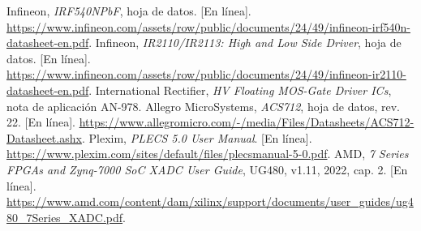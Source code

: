 \expandafter\def\csname fuenteirf\endcsname{Infineon, \textit{IRF540NPbF}, hoja de datos. [En línea]. \url{https://www.infineon.com/assets/row/public/documents/24/49/infineon-irf540n-datasheet-en.pdf}.}
\expandafter\def\csname fuenteir\endcsname{Infineon, \textit{IR2110/IR2113: High and Low Side Driver}, hoja de datos. [En línea]. \url{https://www.infineon.com/assets/row/public/documents/24/49/infineon-ir2110-datasheet-en.pdf}.}
\expandafter\def\csname fuentean978\endcsname{International Rectifier, \textit{HV Floating MOS-Gate Driver ICs}, nota de aplicación AN-978.}
\expandafter\def\csname fuenteacs\endcsname{Allegro MicroSystems, \textit{ACS712}, hoja de datos, rev. 22. [En línea]. \url{https://www.allegromicro.com/-/media/Files/Datasheets/ACS712-Datasheet.ashx}.}
\expandafter\def\csname fuenteplecs\endcsname{Plexim, \textit{PLECS 5.0 User Manual}. [En línea]. \url{https://www.plexim.com/sites/default/files/plecsmanual-5-0.pdf}.}
\expandafter\def\csname fuentexadc\endcsname{AMD, \textit{7 Series FPGAs and Zynq-7000 SoC XADC User Guide}, UG480, v1.11, 2022, cap. 2. [En línea]. \url{https://www.amd.com/content/dam/xilinx/support/documents/user_guides/ug480_7Series_XADC.pdf}.}

\ExplSyntaxOn
{}
\ExplSyntaxOff
